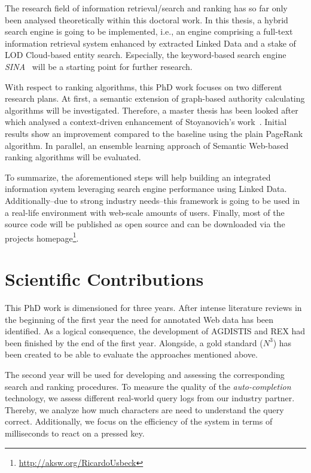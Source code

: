 The research field of information retrieval/search and ranking has so far only been analysed theoretically within this doctoral work. 
In this thesis, a hybrid search engine is going to be implemented, i.e., an engine comprising a full-text information retrieval system enhanced by extracted Linked Data and a stake of LOD Cloud-based entity search.
Especially, the keyword-based search engine \emph{SINA}~\cite{sina} will be a starting point for further research. 

With respect to ranking algorithms, this PhD work focuses on two different research plans.
At first, a semantic extension of graph-based authority calculating algorithms will be investigated. 
Therefore, a master thesis has been looked after which analysed a context-driven enhancement of Stoyanovich's work~\cite{Stoyanovich}.
Initial results show an improvement compared to the baseline using the plain PageRank algorithm.
In parallel, an ensemble learning approach of Semantic Web-based ranking algorithms will be evaluated.

To summarize, the aforementioned steps will help building an integrated information system leveraging search engine performance using Linked Data.
Additionally--due to strong industry needs--this framework is going to be used in a real-life environment with web-scale amounts of users.
Finally, most of the source code will be published as open source and can be downloaded via the projects homepage\footnote{\url{http://aksw.org/RicardoUsbeck}}.

\section{Scientific Contributions}
This PhD work is dimensioned for three years. 
After intense literature reviews in the beginning of the first year the need for annotated Web data has been identified.
As a logical consequence, the development of AGDISTIS and REX had been finished by the end of the first year. 
Alongside, a gold standard ($N^3$) has been created to be able to evaluate the approaches mentioned above.

The second year will be used for developing and assessing the corresponding search and ranking procedures. 
To measure the quality of the \emph{auto-completion} technology, we assess different real-world query logs from our industry partner.
Thereby, we analyze how much characters are need to understand the query correct.
Additionally, we focus on the efficiency of the system in terms of milliseconds to react on a pressed key.

